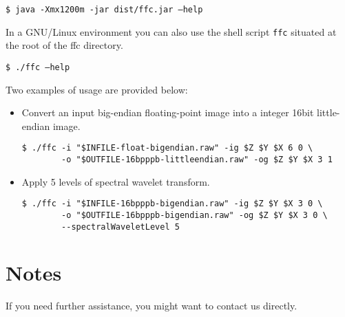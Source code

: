 \documentclass[a4paper,10pt]{article}
\newcommand{\me}{ffc\relax }
\begin{document}
\begin{framed}
\texttt{\$ java -Xmx1200m -jar dist/\me{}.jar --help}
\end{framed}

In a GNU/Linux environment you can also use the shell script \texttt{\me{}} situated at the root of the \me{} directory. 

\begin{framed}
\texttt{\$ ./\me{} --help}
\end{framed}

Two examples of usage are provided below:

\begin{itemize}
\item Convert an input big-endian floating-point image into a integer 16bit little-endian image.
\begin{framed}%
\vspace{-1em}%
\begin{verbatim}
$ ./ffc -i "$INFILE-float-bigendian.raw" -ig $Z $Y $X 6 0 \
        -o "$OUTFILE-16bpppb-littleendian.raw" -og $Z $Y $X 3 1
\end{verbatim}%
\vspace{-1em}%
\end{framed}

\item Apply 5 levels of spectral wavelet transform.
\begin{framed}%
\vspace{-1em}%
\begin{verbatim}
$ ./ffc -i "$INFILE-16bpppb-bigendian.raw" -ig $Z $Y $X 3 0 \
        -o "$OUTFILE-16bpppb-bigendian.raw" -og $Z $Y $X 3 0 \
        --spectralWaveletLevel 5
\end{verbatim}%
\vspace{-1em}%
\end{framed}
\end{itemize}

\section{Notes}

If you need further assistance, you might want to contact us directly.
\end{document}
